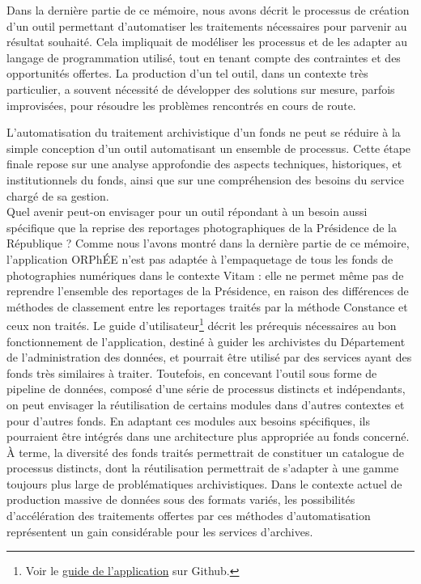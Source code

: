 Dans la dernière partie de ce mémoire, nous avons décrit le processus de création d'un outil permettant d'automatiser les traitements nécessaires pour parvenir au résultat souhaité. Cela impliquait de modéliser les processus et de les adapter au langage de programmation utilisé, tout en tenant compte des contraintes et des opportunités offertes. La production d’un tel outil, dans un contexte très particulier, a souvent nécessité de développer des solutions sur mesure, parfois improvisées, pour résoudre les problèmes rencontrés en cours de route.

L'automatisation du traitement archivistique d'un fonds ne peut se réduire à la simple conception d’un outil automatisant un ensemble de processus. Cette étape finale repose sur une analyse approfondie des aspects techniques, historiques, et institutionnels du fonds, ainsi que sur une compréhension des besoins du service chargé de sa gestion.
\\

Quel avenir peut-on envisager pour un outil répondant à un besoin aussi spécifique que la reprise des reportages photographiques de la Présidence de la République ? Comme nous l'avons montré dans la dernière partie de ce mémoire, l’application ORPhÉE n’est pas adaptée à l’empaquetage de tous les fonds de photographies numériques dans le contexte Vitam : elle ne permet même pas de reprendre l’ensemble des reportages de la Présidence, en raison des différences de méthodes de classement entre les reportages traités par la méthode Constance et ceux non traités. Le guide d’utilisateur\footnote{Voir le \href{https://github.com/SelmaKaina/ORPhEE/blob/main/README.md}{guide de l'application} sur Github.} décrit les prérequis nécessaires au bon fonctionnement de l’application, destiné à guider les archivistes du Département de l’administration des données, et pourrait être utilisé par des services ayant des fonds très similaires à traiter. Toutefois, en concevant l’outil sous forme de pipeline de données, composé d’une série de processus distincts et indépendants, on peut envisager la réutilisation de certains modules dans d’autres contextes et pour d’autres fonds. En adaptant ces modules aux besoins spécifiques, ils pourraient être intégrés dans une architecture plus appropriée au fonds concerné. À terme, la diversité des fonds traités permettrait de constituer un catalogue de processus distincts, dont la réutilisation permettrait de s’adapter à une gamme toujours plus large de problématiques archivistiques. Dans le contexte actuel de production massive de données sous des formats variés, les possibilités d'accélération des traitements offertes par ces méthodes d'automatisation représentent un gain considérable pour les services d'archives.